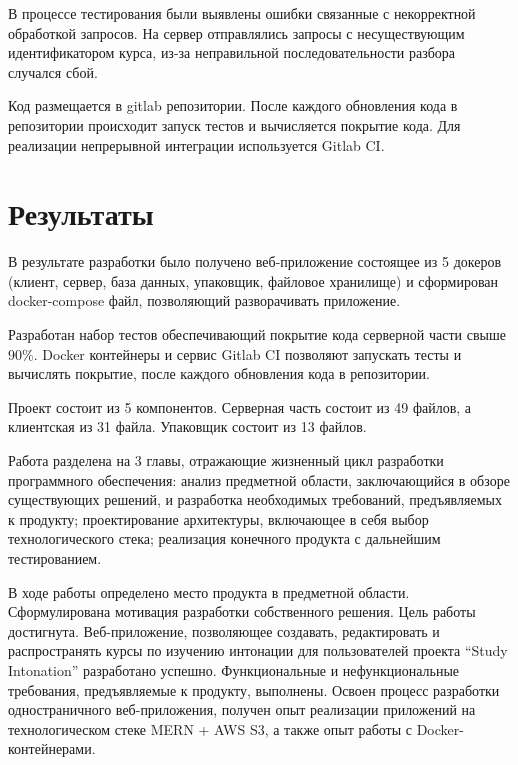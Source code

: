 \documentclass[%
  a5paper,
  subf,
  href,
  master,
  dotsinheaders 
]{csse-fcs}
\begin{document}
В процессе тестирования были выявлены ошибки связанные с некорректной обработкой запросов. На сервер отправлялись запросы с несуществующим идентификатором курса, из-за неправильной последовательности разбора случался сбой.

Код размещается в gitlab репозитории. После каждого обновления кода в репозитории происходит запуск тестов и вычисляется покрытие кода. Для реализации непрерывной интеграции используется Gitlab CI. 

\section{Результаты}

В результате разработки было получено веб-приложение состоящее из 5 докеров (клиент, сервер, база данных, упаковщик, файловое хранилище) и сформирован docker-compose файл, позволяющий разворачивать приложение.

Разработан набор тестов обеспечивающий покрытие кода серверной части свыше 90\%. Docker контейнеры и сервис Gitlab CI позволяют запускать тесты и вычислять покрытие, после каждого обновления кода в репозитории.

Проект состоит из 5 компонентов. Серверная часть состоит из 49 файлов, а клиентская из 31 файла. Упаковщик состоит из 13 файлов.

\conclusion

Работа разделена на 3 главы, отражающие жизненный цикл разработки программного обеспечения: анализ предметной области, заключающийся в обзоре существующих решений, и разработка необходимых требований, предъявляемых к продукту; проектирование архитектуры, включающее в себя выбор технологического стека; реализация конечного продукта с дальнейшим тестированием.

В ходе работы определено место продукта в предметной области. Сформулирована мотивация разработки собственного решения. 
Цель работы достигнута. Веб-приложение, позволяющее создавать, редактировать и распространять курсы по изучению интонации для пользователей проекта “Study Intonation” разработано успешно. Функциональные и нефункциональные требования, предъявляемые к продукту, выполнены. Освоен процесс разработки одностраничного веб-приложения, получен опыт реализации приложений на технологическом стеке MERN + AWS S3, а также опыт работы с Docker-контейнерами.


 


\appendix
{}
\end{document}
